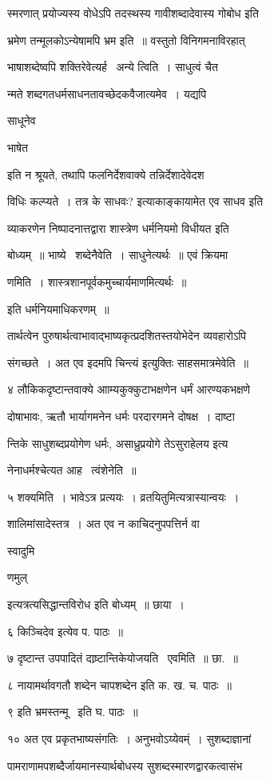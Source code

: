 \documentclass[11pt, openany]{book}
\begin{document}
स्मरणात् प्रयोज्यस्य वोधेऽपि तदस्थस्य गावीशब्दादेवास्य गोबोध इति 

भ्रमेण तन्मूलकोऽन्येषामपि भ्रम इति~॥ वस्तुतो विनिगमनाविरहात् 

भाषाशब्देष्वपि शक्तिरेवेत्यर्ह \textendash\ अन्ये त्विति~। साधुत्वं चैत \textendash\ 

न्मते शब्दगतधर्मसाधनतावच्छेदकवैजात्यमेव~। यद्यपि {\qt साधूनेव 

भाषेत} इति न श्रूयते, तथापि फलनिर्देशवाक्ये तन्निर्देशादेवेदश \textendash\ 

विधिः कल्प्यते~। तत्र {\qt के साधवः?} इत्याकाङ्कायामेत एव साधव इति 

व्याकरणेन निष्पादनात्तद्वारा शास्त्रेण धर्मनियमो विधीयत इति 

बोध्यम्~॥ भाष्ये \textendash\ शब्देनैवेति~। साधुनेत्यर्थः~॥ एवं क्रियमा \textendash\ 

णमिति~। शास्त्रशानपूर्वकमुच्चार्यमाणमित्यर्थः~॥ 

इति धर्मनियमाधिकरणम्~॥ 

तार्थत्वेन पुरुषार्थत्वाभावाद्भाष्यकृत्प्रदशितस्तयोभेदेन व्यवहारोऽपि 

संगच्छते~। अत एव {\qt इदमपि चिन्त्यं} इत्युक्तिः साहसमात्रमेवेति~॥ 

४ लौकिकदृष्टान्तवाक्ये आाम्यकुक्कुटाभक्षणेन धर्मं आरण्यकभक्षणे 

दोषाभावः, ऋतौ भार्यागमनेन धर्मः परदारगमने दोषक्ष~। दाष्टा \textendash\ 

न्तिके साधुशब्दप्रयोगेण धर्मः, असाध्रुप्रयोगे {\qt तेऽसुराहेलय} इत्य \textendash\ 

नेनाधर्मश्चेत्यत आह \textendash\ त्वंशेनेति~॥ 

५ शक्यमिति~। भावेऽत्र प्रत्ययः~। व्रतयितुमित्यत्रास्यान्वयः~। 

शालिमांसादेस्तत्र~। अत एव न काचिदनुपपत्तिर्न वा {\qt स्वादुमि 

णमुल्} इत्यत्रत्यसिद्धान्तविरोध इति बोध्यम्~॥ छाया~। 

६ {\qt किञ्चिदेव} इत्येव प. पाठः~॥ 

७ दृष्टान्त उपपादितं दाष्र्टान्तिकेयोजयति \textendash\ एवमिति~॥ छा.~॥ 

८ {\qt नायामर्थावगतौ शब्देन} चापशब्देन इति क. ख. च. पाठः~॥ 

९ इति भ्रमस्तन्मू \textendash\ इति घ. पाठः~॥ 

१० अत एव प्रकृतभाष्यसंगतिः~। अनुभवोऽय्येवम्ं~। सुशब्दाज्ञानां 

पामराणामपशब्दैर्जायमानस्यार्थबोधस्य सुशब्दस्मारणद्वारकत्वासंभ \textendash\ 
\end{document}
